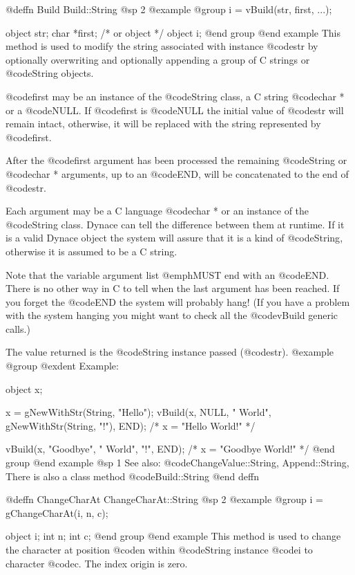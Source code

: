 @deffn {Build} Build::String
@sp 2
@example
@group
i = vBuild(str, first, ...);

object  str;
char    *first;  /*  or object  */
object  i;
@end group
@end example
This method is used to modify the string associated with instance @code{str}
by optionally overwriting and optionally appending a group of C strings or
@code{String} objects.

@code{first} may be an instance of the @code{String} class, a C string
@code{char *} or a @code{NULL}.  If @code{first} is @code{NULL} the initial
value of @code{str} will remain intact, otherwise, it will be replaced
with the string represented by @code{first}.

After the @code{first} argument has been processed the remaining
@code{String} or @code{char *} arguments, up to an @code{END}, 
will be concatenated to the end of @code{str}.

Each argument may be a C language @code{char *} or an instance of the
@code{String} class.  Dynace can tell the difference between them at
runtime.  If it is a valid Dynace object the system will assure that it is
a kind of @code{String}, otherwise it is assumed to be a C string.

Note that the variable argument list @emph{MUST} end with an @code{END}.
There is no other way in C to tell when the last argument has been reached.
If you forget the @code{END} the system will probably hang!  (If you
have a problem with the system hanging you might want to check all the
@code{vBuild} generic calls.)

The value returned is the @code{String} instance passed (@code{str}).
@example
@group
@exdent Example:

object  x;

x = gNewWithStr(String, "Hello");
vBuild(x, NULL, " World", gNewWithStr(String, "!"), END);
/*  x = "Hello World!"  */

vBuild(x, "Goodbye", " World", "!", END);
/*  x = "Goodbye World!"  */
@end group
@end example
@sp 1
See also:  @code{ChangeValue::String, Append::String,}
There is also a class method @code{Build::String}
@end deffn












@deffn {ChangeCharAt} ChangeCharAt::String
@sp 2
@example
@group
i = gChangeCharAt(i, n, c);

object  i;
int     n;
int     c;
@end group
@end example
This method is used to change the character at position @code{n} within
@code{String} instance @code{i} to character @code{c}.  The index origin
is zero.

